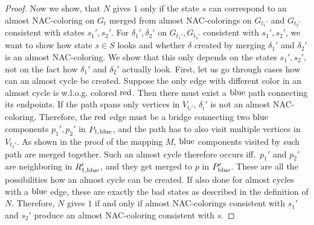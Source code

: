 \begin{proof}
	Now we show, that \( N \) gives \( 1 \) only if the state \( s \)
	can correspond to an almost NAC-coloring on \( G_t \)
	merged from almost NAC-colorings on \( G_{t_1'} \) and \( G_{t_2'} \)
	consistent with states \( s_1', s_2' \).
	For \( \delta_1', \delta_2' \) on \( G_{t_1'}, G_{t_2'} \)
	consistent with \( s_1', s_2' \),
	we want to show how state \( s \in S \) looks and
	whether \( \delta \) created by merging \( \delta_1' \) and \( \delta_2' \)
	is an almost NAC-coloring.
	We show that this only depends on the states \( s_1', s_2' \),
	not on the fact how \( \delta_1' \) and \( \delta_2' \) actually look.
	First, let us go through cases how can an almost cycle be created.
	Suppose the only edge with different color in an almost cycle is w.l.o.g. colored \( \text{red} \).
	Then there must exist a \( \text{blue} \) path connecting its endpoints.
	If the path spans only vertices
	in \( V_{t_i'} \), \( \delta_i' \) is not an almost NAC-coloring.
	Therefore, the \( \text{red} \) edge must be
	a bridge connecting two \( \text{blue} \) components \( p_1', p_2' \) in \( P_{1,\text{blue}} \),
	and the path has to also visit multiple vertices in \( V_{t_2'} \).
	As shown in the proof of the mapping \( M \), \( \text{blue} \) components
	visited by such path are merged together.
	Such an almost cycle therefore occurs
	iff.\ \( p_1' \) and \( p_2' \) are neighboring in \( R_{1,\text{blue}}' \),
	and they get merged to \( p \) in \( P_{\text{blue}}' \).
	These are all the possibilities how an almost cycle can be created.
	If also done for almost cycles with a \( \text{blue} \) edge,
	these are exactly the bad states as described in the definition of \( N \).
	Therefore, \( N \) gives \( 1 \) if and only if almost NAC-colorings
  consistent with \( s_1' \) and \( s_2' \) produce
	an almost NAC-coloring consistent with \( s \).


\end{proof}
